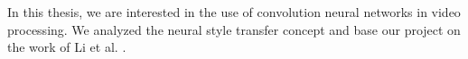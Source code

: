 \documentclass[../Main.tex]{subfiles}
\begin{document}
In this thesis, we are interested in the use of convolution neural networks in video processing. We analyzed the neural style transfer concept and base our project on the work of Li et al. \cite{Li2018}.


\par{} %


\biblio %
\end{document}
